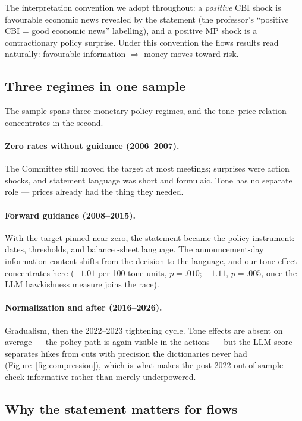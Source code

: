 \documentclass[11pt]{article}
\begin{document}
The interpretation convention we adopt throughout: a \emph{positive} CBI
shock is favourable economic news revealed by the statement (the professor's
``positive CBI = good economic news'' labelling), and a positive MP shock is a
contractionary policy surprise. Under this convention the flows results read
naturally: favourable information $\Rightarrow$ money moves toward risk.

\subsection{Three regimes in one sample}\label{sec:regimes}

The sample spans three monetary-policy regimes, and the tone--price
relation concentrates in the second.

\paragraph{Zero rates without guidance (2006--2007).} The Committee still
moved the target at most meetings; surprises were action shocks, and
statement language was short and formulaic. Tone has no separate role ---
prices already had the thing they needed.

\paragraph{Forward guidance (2008--2015).} With the target pinned near zero,
the statement became the policy instrument: dates, thresholds, and balance
-sheet language. The announcement-day information content shifts from the
decision to the language, and our tone effect concentrates here
($-1.01$ per 100 tone units, $p=.010$; $-1.11$, $p=.005$, once the LLM
hawkishness measure joins the race).

\paragraph{Normalization and after (2016--2026).} Gradualism, then the
2022--2023 tightening cycle. Tone effects are absent on average --- the
policy path is again visible in the actions --- but the LLM score separates
hikes from cuts with precision the dictionaries never had
(Figure~\ref{fig:compression}), which is what makes the post-2022
out-of-sample check informative rather than merely underpowered.

\subsection{Why the statement matters for flows}\label{sec:whystatements}
\end{document}
